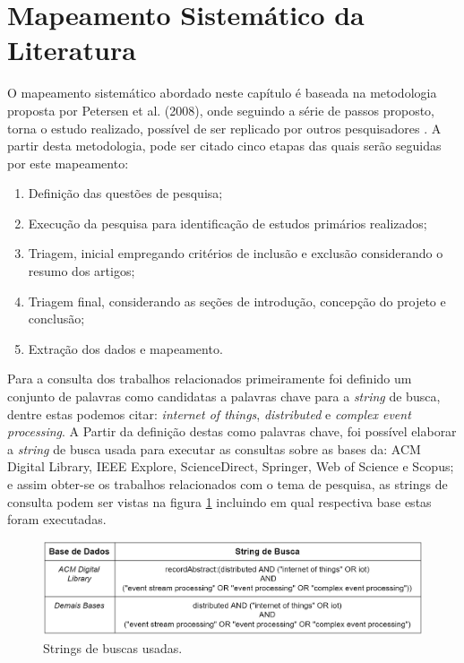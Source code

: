 \documentclass[tid,table]{texufpel} %
\begin{document}
\section{Mapeamento Sistemático da Literatura}

O mapeamento sistemático abordado neste capítulo é baseada na metodologia proposta por Petersen et al. (2008), onde seguindo a série de passos proposto, torna o estudo realizado, possível de ser replicado por outros pesquisadores \cite{petersen08}. A partir desta metodologia, pode ser citado cinco etapas das quais serão seguidas por este mapeamento:

\begin{enumerate}
	\item Definição das questões de pesquisa;
	\item Execução da pesquisa para identificação de estudos primários realizados;
	\item Triagem, inicial empregando critérios de inclusão e exclusão considerando o resumo dos artigos;
	\item Triagem final, considerando as seções de introdução, concepção do projeto e conclusão;
	\item Extração dos dados e mapeamento.
	

\end{enumerate}  

Para a consulta dos trabalhos relacionados primeiramente foi definido um conjunto de palavras como candidatas a palavras chave para a \textit{string} de busca, dentre estas podemos citar: \textit{internet of things}, \textit{distributed} e \textit{complex event processing}. A Partir da definição destas como palavras chave, foi possível elaborar a \textit{string} de busca usada para executar as consultas sobre as bases da: ACM Digital Library, IEEE Explore, ScienceDirect, Springer, Web of Science e Scopus; e assim obter-se os trabalhos relacionados com o tema de pesquisa, as strings de consulta podem ser vistas na figura \ref{tab:stringBusca} incluindo em qual respectiva base estas foram executadas.



\begin{figure}[ht]
	\centering
	\includegraphics[width=1\textwidth]{imagens/tabela_string_busca.png}
	\caption{Strings de buscas usadas.}
	\label{tab:stringBusca}
\end{figure}
\end{document}
